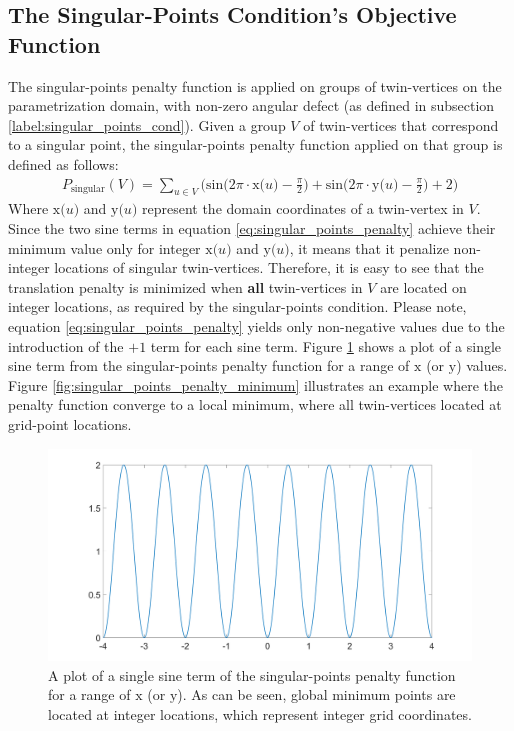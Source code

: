 \subsection{The Singular-Points Condition's Objective Function}
The singular-points penalty function is applied on groups of twin-vertices on the parametrization domain, with non-zero angular defect (as defined in subsection \ref{label:singular_points_cond}). Given a group $V$ of twin-vertices that correspond to a singular point, the singular-points penalty function applied on that group is defined as follows:
\begin{equation}\label{eq:singular_points_penalty}
\begin{split}
P_{\mathrm{singular}}\left(V\right) = \sum_{u \in V} \bigg( \mathrm{sin} \Big( 2\pi\cdot\mathrm{x}\big(u\big) - \frac{\pi}{2}\Big) + \mathrm{sin} \Big( 2\pi\cdot\mathrm{y}\big(u\big) - \frac{\pi}{2}\Big) + 2 \bigg)
\end{split}
\end{equation}
Where $\mathrm{x}\big(u\big)$ and $\mathrm{y}\big(u\big)$ represent the domain coordinates of a twin-vertex in $V$. Since the two sine terms in equation \ref{eq:singular_points_penalty} achieve their minimum value only for integer $\mathrm{x}\big(u\big)$ and $\mathrm{y}\big(u\big)$, it means that it penalize non-integer locations of singular twin-vertices. Therefore, it is easy to see that the translation penalty is minimized when \textbf{all} twin-vertices in $V$ are located on integer locations, as required by the singular-points condition. Please note, equation \ref{eq:singular_points_penalty} yields only non-negative values due to the introduction of the $+1$ term for each sine term. Figure \ref{fig:singular_points_penalty_sine_term} shows a plot of a single sine term from the singular-points penalty function for a range of $\mathrm{x}$ (or $\mathrm{y}$) values. Figure \ref{fig:singular_points_penalty_minimum} illustrates an example where the penalty function converge to a local minimum, where all twin-vertices located at grid-point locations.
\begin{figure}[ht]
\centering
\includegraphics[width=16cm]{figures/singular_points/singular_points_penalty_function_sine_term.png}
\caption[The Singular-Points Penalty Function (Single Sine Term)]{A plot of a single sine term of the singular-points penalty function for a range of $\mathrm{x}$ (or $\mathrm{y}$). As can be seen, global minimum points are located at integer locations, which represent integer grid coordinates.}
\label{fig:singular_points_penalty_sine_term}
\end{figure}
